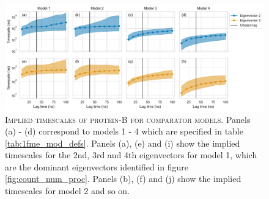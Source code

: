 \documentclass{article}
\begin{document}
\begin{figure}[h]
    \centering
    \includegraphics[width=1\textwidth]{figures/model_comparision_its/prb.pdf}
    \caption{\textsc{Implied timescales of protein-B for comparator models.} Panels (a) - (d) correspond to models 1 - 4 which are specified in table \ref{tab:1fme_mod_defs}. Panels (a), (e) and (i) show the implied timescales for the 2nd, 3rd and 4th eigenvectors for model 1, which are the dominant eigenvectors identified in figure \ref{fig:count_num_proc}.  Panels (b), (f) and (j) show the implied timescales for model 2 and so on.}
    \label{fig:prb_its}
\end{figure}
\end{document}
